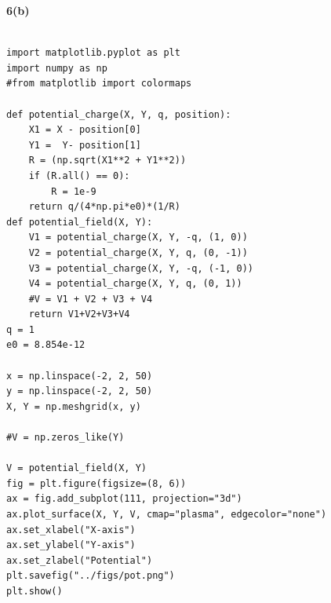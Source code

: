 \documentclass{article}
\begin{document}
\textbf{6(b)}
\begin{lstlisting}

import matplotlib.pyplot as plt
import numpy as np
#from matplotlib import colormaps

def potential_charge(X, Y, q, position):
    X1 = X - position[0]
    Y1 =  Y- position[1]
    R = (np.sqrt(X1**2 + Y1**2))
    if (R.all() == 0):
        R = 1e-9
    return q/(4*np.pi*e0)*(1/R)
def potential_field(X, Y):
    V1 = potential_charge(X, Y, -q, (1, 0))
    V2 = potential_charge(X, Y, q, (0, -1))
    V3 = potential_charge(X, Y, -q, (-1, 0))
    V4 = potential_charge(X, Y, q, (0, 1))
    #V = V1 + V2 + V3 + V4
    return V1+V2+V3+V4
q = 1
e0 = 8.854e-12

x = np.linspace(-2, 2, 50)
y = np.linspace(-2, 2, 50)
X, Y = np.meshgrid(x, y)

#V = np.zeros_like(Y)

V = potential_field(X, Y)
fig = plt.figure(figsize=(8, 6))
ax = fig.add_subplot(111, projection="3d")
ax.plot_surface(X, Y, V, cmap="plasma", edgecolor="none")
ax.set_xlabel("X-axis")
ax.set_ylabel("Y-axis")
ax.set_zlabel("Potential")
plt.savefig("../figs/pot.png")
plt.show()

\end{lstlisting}
\end{document}
